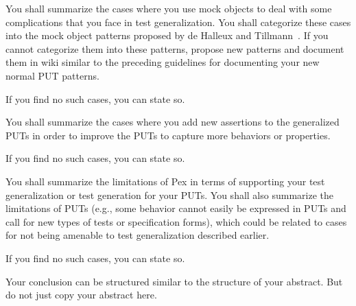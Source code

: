 \documentclass[times, 10pt,twocolumn]{article}
\begin{document}
You shall summarize the cases where you use mock objects to deal
with some complications that you face in test generalization. You
shall categorize these cases into the mock object patterns proposed
by de Halleux and Tillmann~\cite{halleux08:putpatterns}. If you
cannot categorize them into these patterns, propose new patterns and
document them in wiki similar to the preceding guidelines for
documenting your new normal PUT patterns.

If you find no such cases, you can state so.


 \label{sec:assertions}

You shall summarize the cases where you add new assertions to the
generalized PUTs in order to improve the PUTs to capture more
behaviors or properties.

If you find no such cases, you can state so.

 \label{sec:limitations}

You shall summarize the limitations of Pex in terms of supporting
your test generalization or test generation for your PUTs. You shall
also summarize the limitations of PUTs (e.g., some behavior cannot
easily be expressed in PUTs and call for new types of tests or
specification forms), which could be related to cases for not being
amenable to test generalization described earlier.

If you find no such cases, you can state so.


Your conclusion can be structured similar to the structure of your
abstract. But do not just copy your abstract here.




\end{document}
